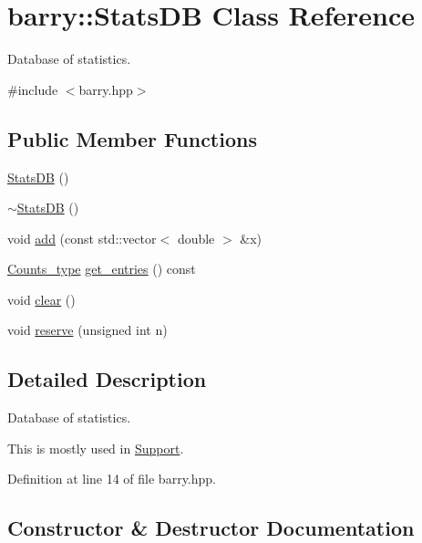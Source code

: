 \hypertarget{classbarry_1_1_stats_d_b}{}\section{barry\+:\+:Stats\+DB Class Reference}
\label{classbarry_1_1_stats_d_b}


Database of statistics.  




{\ttfamily \#include $<$barry.\+hpp$>$}

\subsection*{Public Member Functions}
\begin{DoxyCompactItemize}
\item 
\hyperlink{classbarry_1_1_stats_d_b_a917ba8ccacb9dce050c481eb8a6d3c22}{Stats\+DB} ()
\item 
\hyperlink{classbarry_1_1_stats_d_b_a7d511a6eeeae101e18ae47ca616ad204}{$\sim$\+Stats\+DB} ()
\item 
void \hyperlink{classbarry_1_1_stats_d_b_a8f2d22df8ecf8f12bc54157e86d34696}{add} (const std\+::vector$<$ double $>$ \&x)
\item 
\hyperlink{namespacebarry_a3e2d8c3b6cf602107559d4237d9f1315}{Counts\+\_\+type} \hyperlink{classbarry_1_1_stats_d_b_a396e0921c34a854320a8027ce0f29278}{get\+\_\+entries} () const
\item 
void \hyperlink{classbarry_1_1_stats_d_b_a5de68def55b0a3b99a8f609815624a00}{clear} ()
\item 
void \hyperlink{classbarry_1_1_stats_d_b_a3370b7f2fb16aa047f8a938232a98602}{reserve} (unsigned int n)
\end{DoxyCompactItemize}


\subsection{Detailed Description}
Database of statistics. 

This is mostly used in {\ttfamily \hyperlink{classbarry_1_1_support}{Support}}. 

Definition at line 14 of file barry.\+hpp.



\subsection{Constructor \& Destructor Documentation}
\mbox{\label{classbarry_1_1_stats_d_b_a917ba8ccacb9dce050c481eb8a6d3c22}} 
